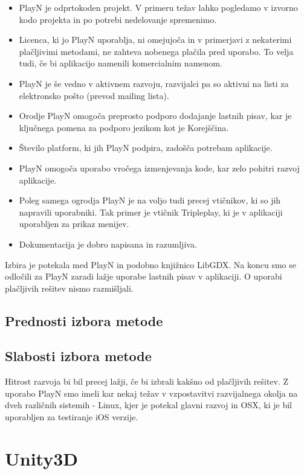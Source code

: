 \begin{itemize}
\item PlayN je odprtokoden projekt. V primeru težav lahko pogledamo v izvorno kodo projekta in po potrebi nedelovanje spremenimo.
\item Licenca, ki jo PlayN uporablja, ni omejujoča in v primerjavi z nekaterimi plačljivimi metodami, ne zahteva nobenega plačila pred uporabo. To velja tudi, če bi aplikacijo namenili komercialnim namenom.
\item PlayN je še vedno v aktivnem razvoju, razvijalci pa so aktivni na listi za elektronsko pošto (prevod mailing lista).
\item Orodje PlayN omogoča preprosto podporo dodajanje lastnih pisav, kar je ključnega pomena za podporo jezikom kot je Korejščina.
\item Število platform, ki jih PlayN podpira, zadošča potrebam aplikacije.
\item PlayN omogoča uporabo vročega izmenjevanja kode, kar zelo pohitri razvoj aplikacije.
\item Poleg samega ogrodja PlayN je na voljo tudi precej vtičnikov, ki so jih napravili uporabniki. Tak primer je vtičnik Tripleplay, ki je v aplikaciji uporabljen za prikaz menijev.
\item Dokumentacija je dobro napisana in razumljiva.
\end{itemize}

Izbira je potekala med PlayN in podobno knjižnico LibGDX. Na koncu smo se odločili za PlayN zaradi lažje uporabe lastnih pisav v aplikaciji. O uporabi plačljivih rešitev nismo razmišljali.

\subsection{Prednosti izbora metode}



\subsection{Slabosti izbora metode}

Hitrost razvoja bi bil precej lažji, če bi izbrali kakšno od plačljivih rešitev. Z uporabo PlayN smo imeli kar nekaj težav v vzpostavitvi razvijalnega okolja na dveh različnih sistemih - Linux, kjer je potekal glavni razvoj in OSX, ki je bil uporabljen za testiranje iOS verzije.

\section{Unity3D}

